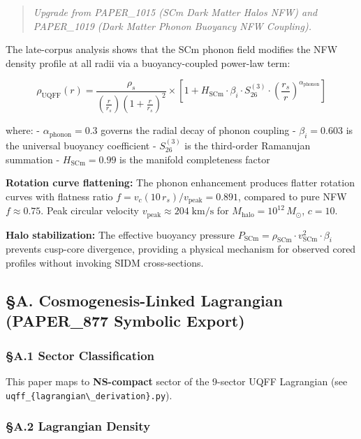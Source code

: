 \begin{quote}
\emph{Upgrade from PAPER\_1015 (SCm Dark Matter Halos NFW) and
PAPER\_1019 (Dark Matter Phonon Buoyancy NFW Coupling).}
\end{quote}

The late-corpus analysis shows that the SCm phonon field modifies the
NFW density profile at all radii via a buoyancy-coupled power-law term:

\[\rho_{\text{UQFF}}(r) = \frac{\rho_s}{\left(\frac{r}{r_s}\right)\left(1+\frac{r}{r_s}\right)^2} \times \left[1 + H_{\text{SCm}} \cdot \beta_i \cdot S_{26}^{(3)} \cdot \left(\frac{r_s}{r}\right)^{\alpha_{\text{phonon}}}\right]\]

where: - \(\alpha_{\text{phonon}} = 0.3\) governs the radial decay of
phonon coupling - \(\beta_i = 0.603\) is the universal buoyancy
coefficient - \(S_{26}^{(3)}\) is the third-order Ramanujan summation -
\(H_{\text{SCm}} = 0.99\) is the manifold completeness factor

\textbf{Rotation curve flattening:} The phonon enhancement produces
flatter rotation curves with flatness ratio
\(f = v_c(10\,r_s)/v_{\text{peak}} = 0.891\), compared to pure NFW
\(f \approx 0.75\). Peak circular velocity
\(v_{\text{peak}} \approx 204\;\text{km/s}\) for
\(M_{\text{halo}} = 10^{12}\,M_\odot\), \(c = 10\).

\textbf{Halo stabilization:} The effective buoyancy pressure
\(P_{\text{SCm}} = \rho_{\text{SCm}} \cdot v_{\text{SCm}}^2 \cdot \beta_i\)
prevents cusp-core divergence, providing a physical mechanism for
observed cored profiles without invoking SIDM cross-sections.

\subsection{§A. Cosmogenesis-Linked Lagrangian (PAPER\_877 Symbolic
Export)}\label{a.-cosmogenesis-linked-lagrangian-paper_877-symbolic-export}

\subsubsection{§A.1 Sector
Classification}\label{a.1-sector-classification}

This paper maps to \textbf{NS-compact} sector of the 9-sector UQFF
Lagrangian (see
\texttt{uqff\_\{lagrangian\textbackslash{}\_derivation\}.py}).

\subsubsection{§A.2 Lagrangian Density}\label{a.2-lagrangian-density}

